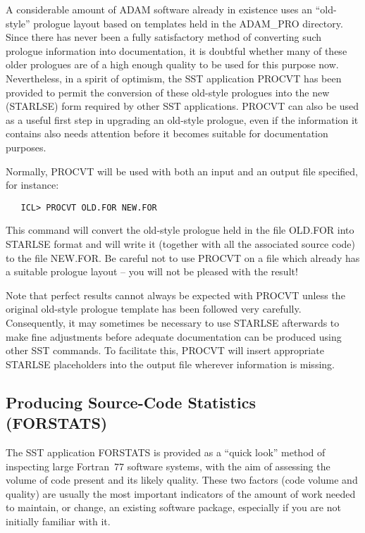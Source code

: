 A considerable amount of ADAM software already in existence uses an
``old-style'' prologue layout based on templates held in the ADAM\_PRO
directory. 
Since there has never been a fully satisfactory method of converting such
prologue information into documentation, it is doubtful whether many of
these older prologues are of a high enough quality to be used for this
purpose now. 
Nevertheless, in a spirit of optimism, the SST application PROCVT has been
provided to permit the conversion of these old-style prologues into the new
(STARLSE) form required by other SST applications. 
PROCVT can also be used as a useful first step in upgrading an old-style
prologue, even if the information it contains also needs attention before it
becomes suitable for documentation purposes. 

Normally, PROCVT will be used with both an input and an output file
specified, for instance: 

\begin{verbatim}
   ICL> PROCVT OLD.FOR NEW.FOR
\end{verbatim}

This command will convert the old-style prologue held in the file OLD.FOR
into STARLSE format and will write it (together with all the associated
source code) to the file NEW.FOR. 
Be careful not to use PROCVT on a file which already has a suitable prologue
layout -- you will not be pleased with the result! 

Note that perfect results cannot always be expected with PROCVT unless the
original old-style prologue template has been followed very carefully.
Consequently, it may sometimes be necessary to use STARLSE afterwards to
make fine adjustments before adequate documentation can be produced using
other SST commands. 
To facilitate this, PROCVT will insert appropriate STARLSE placeholders into
the output file wherever information is missing. 


\subsection{Producing Source-Code Statistics (FORSTATS)}

The SST application FORSTATS is provided as a ``quick look'' method of
inspecting large Fortran~77 software systems, with the aim of assessing the
volume of code present and its likely quality. 
These two factors (code volume and quality) are usually the most important
indicators of the amount of work needed to maintain, or change, an existing
software package, especially if you are not initially familiar with it. 

